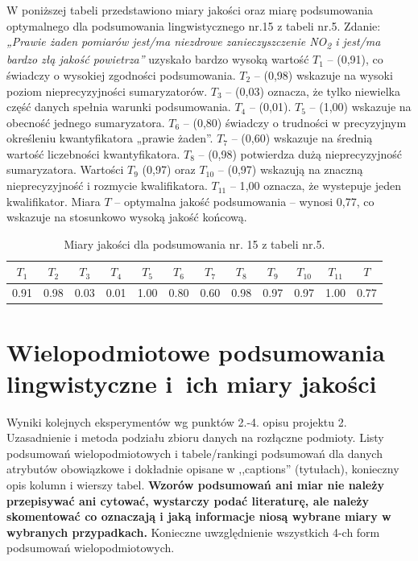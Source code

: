 \documentclass{article}
\begin{document}
W poniższej tabeli przedstawiono miary jakości oraz miarę podsumowania optymalnego dla podsumowania lingwistycznego nr.15 z tabeli nr.5. Zdanie: \textit{„Prawie żaden pomiarów jest/ma niezdrowe zanieczyszczenie NO\textsubscript{2} i jest/ma bardzo złą jakość powietrza”} uzyskało bardzo wysoką wartość \(T_1\) – (0{,}91), co świadczy o wysokiej zgodności podsumowania. \(T_2\)  – (0{,}98) wskazuje na wysoki poziom nieprecyzyjności sumaryzatorów. \(T_3\)  – (0{,}03) oznacza, że tylko niewielka część danych spełnia warunki podsumowania. \(T_4\)  – (0{,}01). \(T_5\)  – (1{,}00) wskazuje na obecność jednego sumaryzatora. \(T_6\)  – (0{,}80) świadczy o trudności w precyzyjnym określeniu kwantyfikatora „prawie żaden”. \(T_7\)  – (0{,}60) wskazuje na średnią wartość liczebności kwantyfikatora. \(T_8\)  – (0{,}98) potwierdza dużą nieprecyzyjność sumaryzatora. Wartości \(T_9\)  (0{,}97) oraz \(T_{10}\)  – (0{,}97) wskazują na znaczną nieprecyzyjność i rozmycie kwalifikatora. \(T_{11}\)  – 1{,}00 oznacza, że wystepuje jeden kwalifikator. Miara \(T\)  – optymalna jakość podsumowania – wynosi 0{,}77, co wskazuje na stosunkowo wysoką jakość końcową.


\begin{table}[H]
    \centering
    \begin{tabular}{|c|c|c|c|c|c|c|c|c|c|c|c|}
    \hline
    \textbf{\(T_1\)} &\textbf{\(T_2\)} & \textbf{\(T_3\)} & \textbf{\(T_4\)} & \textbf{\(T_5\)} & \textbf{\(T_6\)} & \textbf{\(T_7\)} & \textbf{\(T_8\)} & \textbf{\(T_9\)} & \textbf{\(T_{10}\)} & \textbf{\(T_{11}\)} & \textbf{\(T\)} \\ \hline
    0.91 & 0.98 & 0.03 & 0.01 & 1.00 & 0.80 & 0.60 & 0.98 & 0.97 & 0.97 & 1.00 & 0.77 \\ \hline
    \end{tabular}
    \caption{Miary jakości dla podsumowania nr. 15 z tabeli nr.5.}
\end{table}  


\section{Wielopodmiotowe podsumowania lingwistyczne i~ich miary jakości} 
Wyniki kolejnych eksperymentów wg punktów 2.-4. opisu projektu 2. Uzasadnienie i
metoda podziału zbioru danych na rozłączne podmioty. Listy podsumowań
wielopodmiotowych i tabele/rankingi podsumowań dla danych atrybutów obowiązkowe i
dokładnie opisane w ,,captions'' (tytułach), konieczny opis kolumn i wierszy tabel.
{\bf Wzorów podsumowań ani miar nie należy przepisywać ani cytować, wystarczy podać literaturę, ale
należy skomentować co oznaczają i jaką informacje niosą wybrane miary w wybranych
przypadkach.} Konieczne uwzględnienie wszystkich 4-ch form podsumowań wielopodmiotowych. 
\\ 
\end{document}
